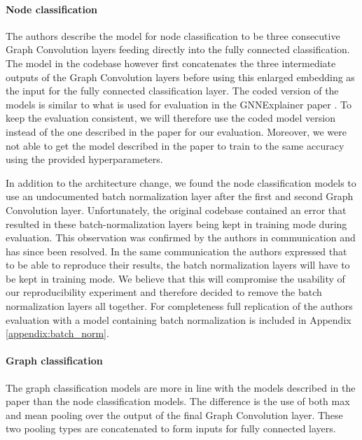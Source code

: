\paragraph{Node classification}
The authors describe the model for node classification to be three consecutive Graph Convolution layers feeding directly into the fully connected classification. The model in the codebase however first concatenates the three intermediate outputs of the Graph Convolution layers before using this enlarged embedding as the input for the fully connected classification layer. The coded version of the models is similar to what is used for evaluation in the GNNExplainer paper \cite{ying2019gnnexplainer}. To keep the evaluation consistent, we will therefore use the coded model version instead of the one described in the paper for our evaluation. Moreover, we were not able to get the model described in the paper to train to the same accuracy using the provided hyperparameters. 

In addition to the architecture change, we found the node classification models to use an undocumented batch normalization layer after the first and second Graph Convolution layer. Unfortunately, the original codebase contained an error that resulted in these batch-normalization layers being kept in training mode during evaluation. This observation was confirmed by the authors in communication and has since been resolved. In the same communication the authors expressed that to be able to reproduce their results, the batch normalization layers will have to be kept in training mode. We believe that this will compromise the usability of our reproducibility experiment and therefore decided to remove the batch normalization layers all together. For completeness full replication of the authors evaluation with a model containing batch normalization is included in Appendix \ref{appendix:batch_norm}.

\paragraph{Graph classification}
The graph classification models are more in line with the models described in the paper than the node classification models. The difference is the use of both max and mean pooling over the output of the final Graph Convolution layer. These two pooling types are concatenated to form inputs for fully connected layers.  


